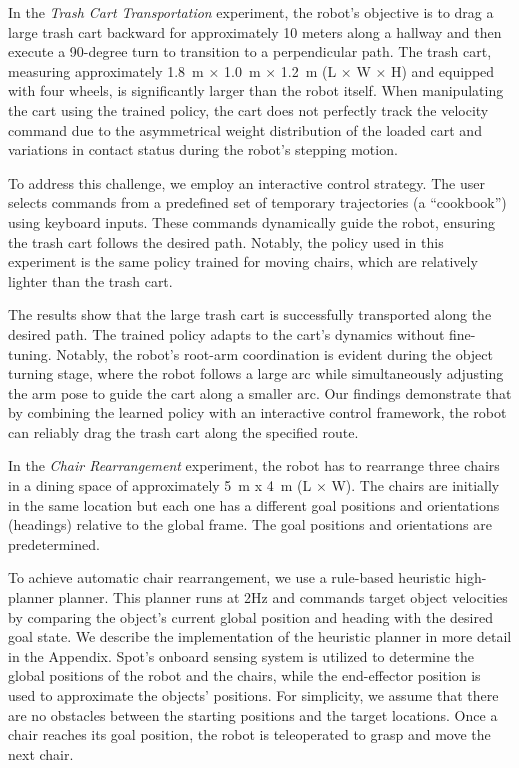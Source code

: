  
In the \textit{Trash Cart Transportation} experiment, the robot's objective is to drag a large trash cart backward for approximately 10 meters along a hallway and then execute a 90-degree turn to transition to a perpendicular path. The trash cart, measuring approximately 1.8~m × 1.0~m × 1.2~m (L × W × H) and equipped with four wheels, is significantly larger than the robot itself. When manipulating the cart using the trained policy, the cart does not perfectly track the velocity command due to the asymmetrical weight distribution of the loaded cart and variations in contact status during the robot's stepping motion. 

To address this challenge, we employ an interactive control strategy. The user selects commands from a predefined set of temporary trajectories (a ``cookbook'') using keyboard inputs. These commands dynamically guide the robot, ensuring the trash cart follows the desired path. Notably, the policy used in this experiment is the same policy trained for moving chairs, which are relatively lighter than the trash cart.

The results show that the large trash cart is successfully transported along the desired path. The trained policy adapts to the cart's dynamics without fine-tuning. Notably, the robot’s root-arm coordination is evident during the object turning stage, where the robot follows a large arc while simultaneously adjusting the arm pose to guide the cart along a smaller arc. Our findings demonstrate that by combining the learned policy with an interactive control framework, the robot can reliably drag the trash cart along the specified route.




In the \textit{Chair Rearrangement} experiment, the robot has to rearrange three chairs in a dining space of approximately 5~m x 4~m (L × W). The chairs are initially in the same location but each one has a different goal positions and orientations (headings) relative to the global frame. The goal positions and orientations are predetermined. 

To achieve automatic chair rearrangement, we use a rule-based heuristic high-planner planner. This planner runs at 2Hz and commands target object velocities by comparing the object’s current global position and heading with the desired goal state. We describe the implementation of the heuristic planner in more detail in the Appendix. Spot’s onboard sensing system is utilized to determine the global positions of the robot and the chairs, while the end-effector position is used to approximate the objects' positions. For simplicity, we assume that there are no obstacles between the starting positions and the target locations. Once a chair reaches its goal position, the robot is teleoperated to grasp and move the next chair.



